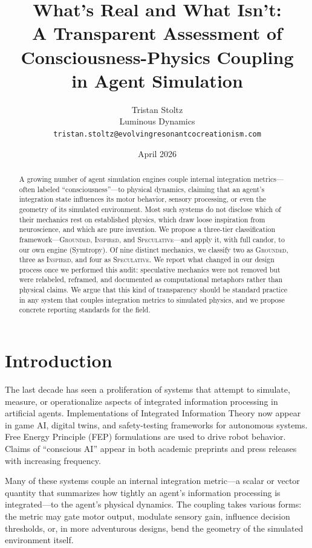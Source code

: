 \documentclass[12pt,a4paper]{article}
\title{What's Real and What Isn't:\\
A Transparent Assessment of Consciousness-Physics Coupling\\
in Agent Simulation}
\author{Tristan Stoltz\\
  Luminous Dynamics\\
  \texttt{tristan.stoltz@evolvingresonantcocreationism.com}}
\date{April 2026}
\begin{document}
\maketitle

\begin{abstract}
A growing number of agent simulation engines couple internal
integration metrics---often labeled ``consciousness''---to
physical dynamics, claiming that an agent's integration state
influences its motor behavior, sensory processing, or even the
geometry of its simulated environment.  Most such systems do not
disclose which of their mechanics rest on established physics,
which draw loose inspiration from neuroscience, and which are
pure invention.  We propose a three-tier classification
framework---\textsc{Grounded}, \textsc{Inspired}, and
\textsc{Speculative}---and apply it, with full candor, to our
own engine (Symtropy).  Of nine distinct mechanics, we classify
two as \textsc{Grounded}, three as \textsc{Inspired}, and four
as \textsc{Speculative}.  We report what changed in our design
process once we performed this audit: speculative mechanics were
not removed but were relabeled, reframed, and documented as
computational metaphors rather than physical claims.  We argue
that this kind of transparency should be standard practice in
any system that couples integration metrics to simulated physics,
and we propose concrete reporting standards for the field.
\end{abstract}

\section{Introduction}
\label{sec:introduction}

The last decade has seen a proliferation of systems that attempt
to simulate, measure, or operationalize aspects of integrated
information processing in artificial agents.  Implementations of
Integrated Information Theory
\citep{tononi2004,oizumi2014} now appear in game AI, digital
twins, and safety-testing frameworks for autonomous systems.
Free Energy Principle (FEP) formulations
\citep{friston2010} are used to drive robot behavior.
Claims of ``conscious AI'' appear in both academic preprints and
press releases with increasing frequency.

Many of these systems couple an internal integration metric---a
scalar or vector quantity that summarizes how tightly an agent's
information processing is integrated---to the agent's physical
dynamics.  The coupling takes various forms: the metric may gate
motor output, modulate sensory gain, influence decision
thresholds, or, in more adventurous designs, bend the geometry
of the simulated environment itself.
\end{document}
